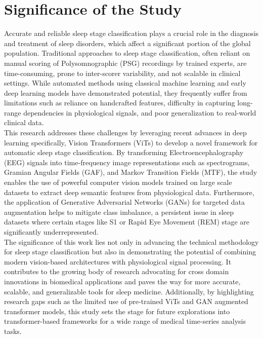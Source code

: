 \section{Significance of the Study }

Accurate and reliable sleep stage classification plays a crucial role in the diagnosis and treatment of sleep disorders, which affect a significant portion of the global population. Traditional approaches to sleep stage classification, often reliant on manual scoring of Polysomnographic (PSG) recordings by trained experts, are time-consuming, prone to inter-scorer variability, and not scalable in clinical settings. While automated methods using classical machine learning and early deep learning models have demonstrated potential, they frequently suffer from limitations such as reliance on handcrafted features, difficulty in capturing long-range dependencies in physiological signals, and poor generalization to real-world clinical data. \\

This research addresses these challenges by leveraging recent advances in deep learning specifically, Vision Transformers (ViTs) to develop a novel framework for automatic sleep stage classification. By transforming Electroencephalography (EEG) signals into time-frequency image representations such as spectrograms, Gramian Angular Fields (GAF), and Markov Transition Fields (MTF), the study enables the use of powerful computer vision models trained on large scale datasets to extract deep semantic features from physiological data. Furthermore, the application of Generative Adversarial Networks (GANs) for targeted data augmentation helps to mitigate class imbalance, a persistent issue in sleep datasets where certain stages like S1 or Rapid Eye Movement (REM) stage are significantly underrepresented. \\

The significance of this work lies not only in advancing the technical methodology for sleep stage classification but also in demonstrating the potential of combining modern vision-based architectures with physiological signal processing. It contributes to the growing body of research advocating for cross domain innovations in biomedical applications and paves the way for more accurate, scalable, and generalizable tools for sleep medicine. Additionally, by highlighting research gaps such as the limited use of pre-trained ViTs and GAN augmented transformer models, this study sets the stage for future explorations into transformer-based frameworks for a wide range of medical time-series analysis tasks.

